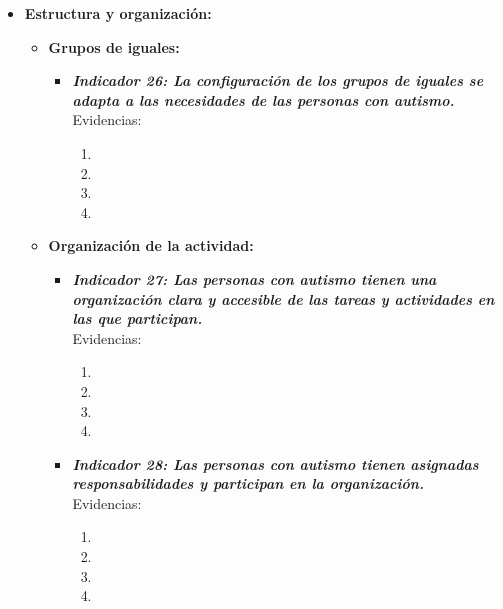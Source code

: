 \begin{itemize}
\begin{itemize}
\begin{itemize}
			\begin{enumerate}
				\item 
				\item 
				\item 
				\item 
			\end{enumerate}
			
		\end{itemize}
	\end{itemize}

	\item \textbf{Estructura y organización:}
	\begin{itemize}
		\item \textbf{Grupos de iguales:}
		\begin{itemize}
			\item \textbf{\textit{Indicador 26: La configuración de los grupos de iguales se adapta a las necesidades de las personas con autismo.}}\\Evidencias:
			
			\begin{enumerate}
				\item 
				\item 
				\item 
				\item 
			\end{enumerate}
		\end{itemize}
		\item \textbf{Organización de la actividad:}
		\begin{itemize}
			\item \textbf{\textit{Indicador 27: Las personas con autismo tienen una organización clara y accesible de las tareas y actividades en las que participan.}}\\Evidencias:
			
			\begin{enumerate}
				\item 
				\item 
				\item 
				\item 
			\end{enumerate}
			\item \textbf{\textit{Indicador 28: Las personas con autismo tienen asignadas responsabilidades y participan en la organización.}}\\Evidencias:
			
			\begin{enumerate}
				\item 
				\item 
				\item 
				\item 
			\end{enumerate}
		\end{itemize}


\end{itemize}
\end{itemize}
